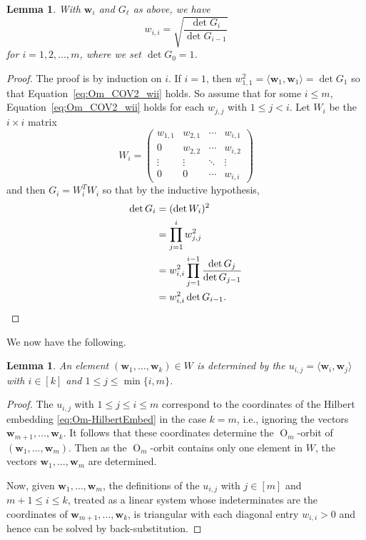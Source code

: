\documentclass[twoside]{amsart}
\newtheorem{lemma}[theorem]{Lemma}
\theoremstyle{definition}
\theoremstyle{remark}
\numberwithin{equation}{section}
\newcommand{\OO}{\operatorname{O}}
\begin{document}
\begin{lemma}
\label{lem:Om_COV2_wii}
With $\mathbf{w}_i$ and $G_\ell$ as above, we have
\begin{equation}
\label{eq:Om_COV2_wii}
    w_{i,i} =   \sqrt{ \frac{\det G_i}{\det G_{i-1}} }
\end{equation}
for $i = 1, 2, \ldots, m$, where we set $\det G_0 = 1$.
\end{lemma}
\begin{proof}
The proof is by induction on $i$. If $i = 1$, then $w_{1,1}^2 = \langle\mathbf{w}_1,\mathbf{w}_1\rangle = \det G_1$ so that
Equation~\eqref{eq:Om_COV2_wii} holds. So assume that for some $i \leq m$, Equation~\eqref{eq:Om_COV2_wii} holds for each
$w_{j,j}$ with $1\leq j < i$. Let $W_i$ be the $i\times i$ matrix
\begin{equation}
\label{eq:Om_COV2_wiiMatrix}
    W_i =
    \begin{pmatrix}
        w_{1,1} &   w_{2,1} &   \cdots  &   w_{i,1}   \\
        0       &   w_{2,2} &   \cdots  &   w_{i,2}   \\
        \vdots  &   \vdots  &   \ddots  &   \vdots    \\
        0       &   0       &   \cdots  &   w_{i,i}
    \end{pmatrix}
\end{equation}
and then $G_i = W_i^T W_i$ so that by the inductive hypothesis,
\begin{align*}
    \det G_i
    &=      (\det W_i)^2
    \\&=    \prod\limits_{j=1}^i w_{j,j}^2
    \\&=    w_{i,i}^2 \prod\limits_{j=1}^{i-1} \frac{\det G_j}{\det G_{j-1}}
    \\&=    w_{i,i}^2 \det G_{i-1}.
    \qedhere
\end{align*}
\end{proof}

We now have the following.

\begin{lemma}
\label{lem:Om_COV2_SolveUforW}
An element $(\mathbf{w}_1,\ldots,\mathbf{w}_k)\in W$ is determined by the
$u_{i,j} = \langle\mathbf{w}_i,\mathbf{w}_j\rangle$ with $i\in[k]$ and $1\leq j \leq \min\{i,m\}$.
\end{lemma}
\begin{proof}
The $u_{i,j}$ with $1\leq j \leq i\leq m$ correspond to the coordinates of the Hilbert embedding \eqref{eq:Om-HilbertEmbed} in the case $k = m$,
i.e., ignoring the vectors $\mathbf{w}_{m+1}, \ldots, \mathbf{w}_k$. It follows that these coordinates determine the $\OO_m$-orbit of
$(\mathbf{w}_1,\ldots,\mathbf{w}_m)$. Then as the $\OO_m$-orbit contains only one element in $W$, the vectors $\mathbf{w}_1,\ldots,\mathbf{w}_m$
are determined. 

Now, given $\mathbf{w}_1,\ldots,\mathbf{w}_m$, the definitions of the $u_{i,j}$ with $j\in[m]$ and $m + 1 \leq i \leq k$, treated as a linear system
whose indeterminates are the coordinates of $\mathbf{w}_{m+1},\ldots,\mathbf{w}_k$, is triangular with each diagonal entry $w_{i,i} > 0$ and hence
can be solved by back-substitution.
\end{proof}
\end{document}
